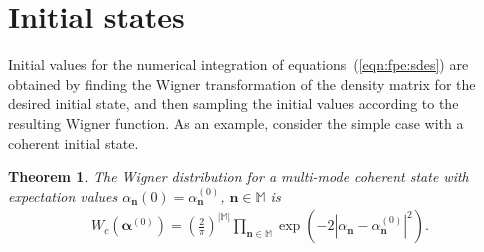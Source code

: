 \documentclass[12pt,aip,jmp,amssymb,amsmath]{revtex4-1}
\newcommand{\nvec}{\boldsymbol{n}}
\newcommand{\balpha}{\boldsymbol{\alpha}}
\newcommand{\restbasis}{\mathbb{M}}
\newcommand{\eqnref}[1]{(\ref{eqn:#1})}
\newtheorem{theorem}{Theorem}
\begin{document}
\section{Initial states}

Initial values for the numerical integration of equations~\eqnref{fpe:sdes} are obtained by finding the Wigner transformation of the density matrix for the desired initial state, and then sampling the initial values according to the resulting Wigner function.
As an example, consider the simple case with a coherent initial state.

\begin{theorem}
    The Wigner distribution for a multi-mode coherent state with expectation values
    $\alpha_{\nvec}(0) = \alpha_{\nvec}^{(0)}$, $\nvec \in \restbasis$ is
    \begin{equation*}\begin{split}
        W_c (\balpha^{(0)})
        = \left( \frac{2}{\pi} \right)^{|\restbasis|} \prod_{\nvec \in \restbasis}
            \exp(-2 |\alpha_{\nvec} - \alpha_{\nvec}^{(0)}|^2).
    \end{split}\end{equation*}
\end{theorem}
\end{document}
